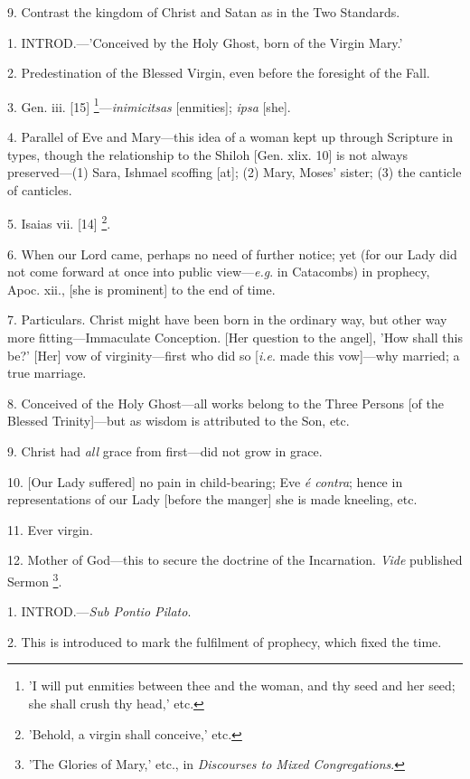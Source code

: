 9. Contrast the kingdom of Christ and Satan as in
the Two Standards.


1. INTROD.—'Conceived
by the Holy Ghost, born of the Virgin Mary.'

2. Predestination of the Blessed Virgin, even
before the foresight of the Fall.

3. Gen. iii. [15] \footnote{'I will put enmities
between thee and the woman, and thy seed and her seed; she shall crush
thy head,' etc.}—\emph{inimicitsas} [enmities]; \emph{ipsa} [she].

4. Parallel of Eve and Mary—this idea of a
woman kept up through Scripture in types, though the relationship to
the Shiloh [Gen. xlix. 10] is not always preserved—(1) Sara, Ishmael
scoffing [at]; (2) Mary, Moses' sister; (3) the canticle of canticles.

5. Isaias vii. [14] \footnote{'Behold, a virgin shall
conceive,' etc.}.

6. When our Lord came, perhaps no need of further
notice; yet (for our Lady did not come forward at once into public
view—\emph{e.g}. in Catacombs) in prophecy, Apoc. xii., [she is
prominent] to the end of time.

7. Particulars. Christ might have been born in
the ordinary way, but other way more fitting—Immaculate Conception.
[Her question to the angel], 'How shall this be?' [Her] vow of
virginity—first who did so [\emph{i.e}. made this vow]—why
married; a true marriage.

8. Conceived of the Holy Ghost—all works belong
to the Three Persons [of the Blessed Trinity]—but as wisdom is
attributed to the Son, etc.

9. Christ had \emph{all} grace from first—did
not grow in grace.

10. [Our Lady suffered] no pain in child-bearing;
Eve \emph{é contra}; hence in representations of our Lady [before the
manger] she is made kneeling, etc.

11. Ever virgin.

12. Mother of God—this to secure the doctrine
of the Incarnation. \emph{Vide} published Sermon \footnote{'The Glories of Mary,'
etc., in \emph{Discourses to Mixed Congregations}.}.


1. INTROD.—\emph{Sub
Pontio Pilato}.

2. This is introduced to mark the fulfilment of
prophecy, which fixed the time.

